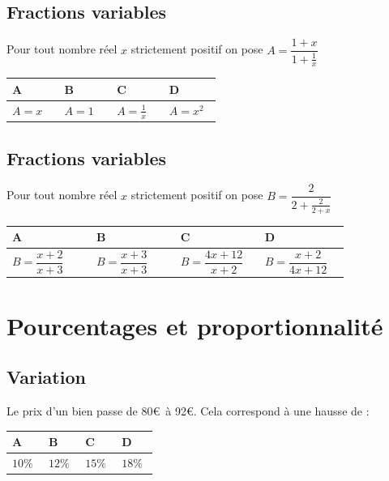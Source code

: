 \documentclass[oneside,12pt]{article}
\let\oldsection\section
\renewcommand{\section}{\newpage\oldsection}
\begin{document}
\subsection{Fractions variables}
Pour tout nombre réel $x$ strictement positif on pose $A=\dfrac{1+x}{1+\frac{1}{x}}$

\begin{center}
	\renewcommand{\arraystretch}{1.5}
	\begin{tabular}{| P{0.22\linewidth} | P{0.22\linewidth} | P{0.22\linewidth} | P{0.22\linewidth} |} \hline
	A & B & C & D \\ \hline
	\rule{0pt}{6mm}
	$A=x$ & $A=1$ & $A=\frac{1}{x}$ & $A=x^2$ \\[1pt] \hline
	\end{tabular}
\end{center}



\subsection{Fractions variables}
Pour tout nombre réel $x$ strictement positif on pose $B=\dfrac{2}{2+\frac{2}{2+x}}$

\begin{center}
	\renewcommand{\arraystretch}{1.35}
	\begin{tabular}{| P{0.22\linewidth} | P{0.22\linewidth} | P{0.22\linewidth} | P{0.22\linewidth} |} \hline
	A & B & C & D \\ \hline
	\rule{0pt}{8mm}
	$B=\dfrac{x+2}{x+3}$ & $B=\dfrac{x+3}{x+3}$ & $B=\dfrac{4x+12}{x+2}$ & $B=\dfrac{x+2}{4x+12}$ \\[8pt] \hline
	\end{tabular}
\end{center}



\section{Pourcentages et proportionnalité}

\subsection{Variation}
Le prix d'un bien passe de 80\euro\, à 92\euro. Cela correspond à une hausse de :

\begin{center}
	\renewcommand{\arraystretch}{1.35}
	\begin{tabular}{| P{0.22\linewidth} | P{0.22\linewidth} | P{0.22\linewidth} | P{0.22\linewidth} |} \hline
	A & B & C & D \\ \hline
	$10\%$ & $12\%$ & $15\%$ & $18\%$ \\\hline
	\end{tabular}
\end{center}
\end{document}
